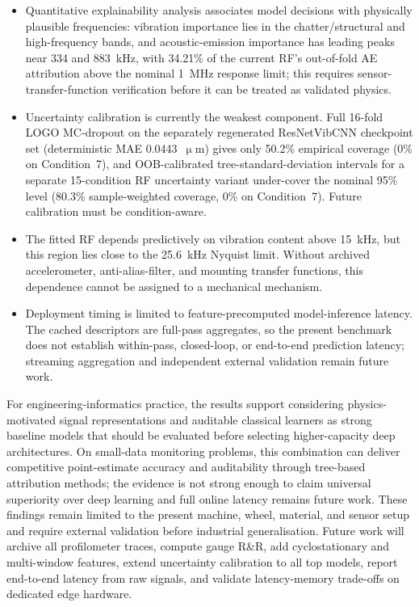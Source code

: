 \begin{itemize}
\item
  Quantitative explainability analysis associates model decisions with
  physically plausible frequencies: vibration importance lies in the
  chatter/structural and high-frequency bands, and acoustic-emission
  importance has leading peaks near 334 and 883~kHz, with 34.21\% of the
  current RF's out-of-fold AE attribution above the nominal 1~MHz response
  limit; this requires sensor-transfer-function verification before it
  can be treated as validated physics.
\item
  Uncertainty calibration is currently the weakest component. Full
  16-fold LOGO MC-dropout on the separately regenerated ResNetVibCNN
  checkpoint set (deterministic MAE 0.0443~\(\upmu\)m) gives only 50.2\% empirical coverage
  (0\% on Condition~7), and OOB-calibrated tree-standard-deviation
  intervals for a separate 15-condition RF uncertainty variant under-cover the nominal 95\% level
  (80.3\% sample-weighted coverage, 0\% on Condition~7). Future
  calibration must be condition-aware.
\item
  The fitted RF depends predictively on vibration content above 15~kHz, but
  this region lies close to the 25.6~kHz Nyquist limit. Without archived
  accelerometer, anti-alias-filter, and mounting transfer functions, this
  dependence cannot be assigned to a mechanical mechanism.
\item
  Deployment timing is limited to feature-precomputed model-inference
  latency. The cached descriptors are full-pass aggregates, so the present
  benchmark does not establish within-pass, closed-loop, or end-to-end
  prediction latency; streaming aggregation and independent external
  validation remain future work.
\end{itemize}

For engineering-informatics practice, the results support considering
physics-motivated signal representations and auditable classical learners as strong baseline
models that should be evaluated before selecting higher-capacity deep
architectures. On small-data monitoring
problems, this combination can deliver competitive point-estimate
accuracy and auditability through tree-based attribution methods; the
evidence is not strong enough to claim universal superiority over deep
learning and full online latency remains future work. These findings
remain limited to the present machine, wheel, material, and sensor setup
and require external validation before industrial generalisation. Future
work will archive all profilometer traces, compute gauge R\&R, add
cyclostationary and multi-window features, extend uncertainty calibration
to all top models, report end-to-end latency from raw signals, and
validate latency-memory trade-offs on dedicated edge hardware.
